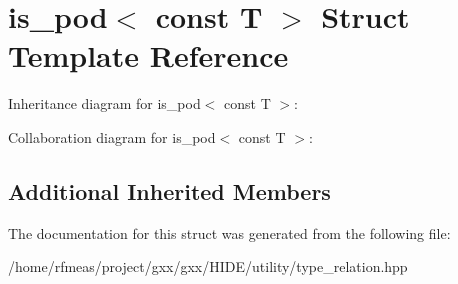 \hypertarget{structis__pod_3_01const_01T_01_4}{}\section{is\+\_\+pod$<$ const T $>$ Struct Template Reference}
\label{structis__pod_3_01const_01T_01_4}


Inheritance diagram for is\+\_\+pod$<$ const T $>$\+:


Collaboration diagram for is\+\_\+pod$<$ const T $>$\+:
\subsection*{Additional Inherited Members}


The documentation for this struct was generated from the following file\+:\begin{DoxyCompactItemize}
\item 
/home/rfmeas/project/gxx/gxx/\+H\+I\+D\+E/utility/type\+\_\+relation.\+hpp\end{DoxyCompactItemize}
